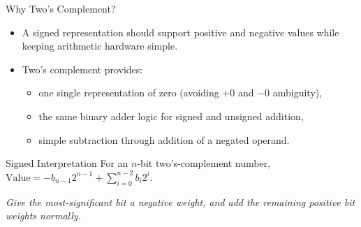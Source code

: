 \documentclass[aspectratio=169,11pt,t]{beamer}
\begin{document}
\begin{frame}{Why Two's Complement?}

\begin{itemize}\setlength{\itemsep}{5pt}
  \item A signed representation should support positive and negative values while keeping arithmetic hardware simple.
  \item Two's complement provides:
  \begin{itemize}\setlength{\itemsep}{2pt}
    \item one single representation of zero (avoiding $+0$ and $-0$ ambiguity),
    \item the same binary adder logic for signed and unsigned addition,
    \item simple subtraction through addition of a negated operand.
  \end{itemize}
\end{itemize}

\vfill

\begin{block}{Signed Interpretation}
For an $n$-bit two's-complement number, $\text{Value} = -b_{n-1}2^{n-1} + \sum_{i=0}^{n-2} b_i2^i$.
\end{block}

\emph{Give the most-significant bit a negative weight, and add the remaining positive bit weights normally.}

\end{frame}





\end{document}
